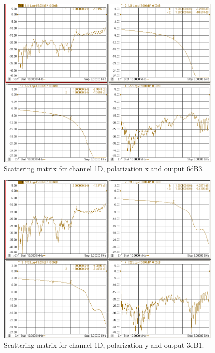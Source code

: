\documentclass[12pt,a4paper,oneside]{article}
\begin{document}
\begin{figure}[H]
\centering
\includegraphics[width=0.9\linewidth]{VNA_results/1Dx_6dB3.png}
\caption{Scattering matrix for channel 1D, polarization x and output 6dB3.}
\label{fig:1Dx_6dB3}
\end{figure}


\begin{figure}[H]
\centering
\includegraphics[width=0.9\linewidth]{VNA_results/1Dy_3dB1.png}
\caption{Scattering matrix for channel 1D, polarization y and output 3dB1.}
\label{fig:1Dy_3dB1}
\end{figure}
\end{document}
